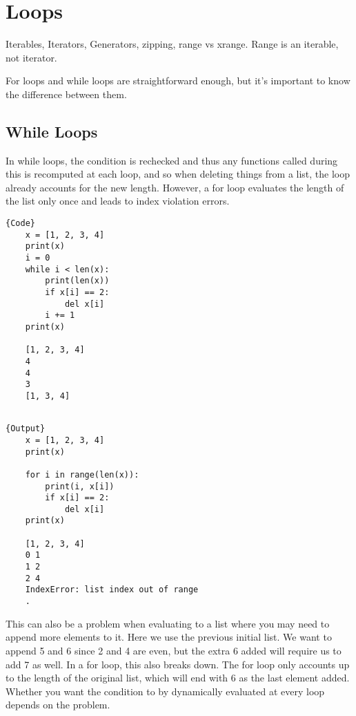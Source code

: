 \section{Loops}

  Iterables, Iterators, Generators, zipping, range vs xrange. Range is an iterable, not iterator. 

  For loops and while loops are straightforward enough, but it's important to know the difference between them. 

\subsection{While Loops}

  In while loops, the condition is rechecked and thus any functions called during this is recomputed at each loop, and so when deleting things from a list, the loop already accounts for the new length. However, a for loop evaluates the length of the list only once and leads to index violation errors.  

  \noindent\begin{minipage}{.5\textwidth}
  \begin{lstlisting}[]{Code}
    x = [1, 2, 3, 4]
    print(x)
    i = 0
    while i < len(x): 
        print(len(x))
        if x[i] == 2: 
            del x[i]
        i += 1
    print(x)

    [1, 2, 3, 4]
    4
    4
    3
    [1, 3, 4]
    
  \end{lstlisting}
  \end{minipage}
  \hfill
  \begin{minipage}{.49\textwidth}
  \begin{lstlisting}[]{Output}
    x = [1, 2, 3, 4]
    print(x) 

    for i in range(len(x)):
        print(i, x[i])
        if x[i] == 2: 
            del x[i]
    print(x)

    [1, 2, 3, 4]
    0 1
    1 2
    2 4
    IndexError: list index out of range
    .
  \end{lstlisting}
  \end{minipage}

  This can also be a problem when evaluating to a list where you may need to append more elements to it. Here we use the previous initial list. We want to append 5 and 6 since 2 and 4 are even, but the extra 6 added will require us to add 7 as well.   In a for loop, this also breaks down. The for loop only accounts up to the length of the original list, which will end with 6 as the last element added. Whether you want the condition to by dynamically evaluated at every loop depends on the problem. 

